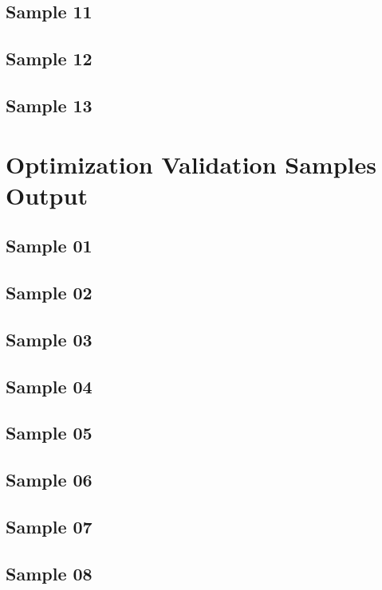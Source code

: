 \documentclass[]{article}
\begin{document}
		\subsection{Sample 11}  \pagebreak
		\subsection{Sample 12}  
		\subsection{Sample 13}  \pagebreak
	
	\section{Optimization Validation Samples Output}
		\subsection{Sample 01}  \pagebreak
		\subsection{Sample 02}  \pagebreak
		\subsection{Sample 03}  \pagebreak
		\subsection{Sample 04}  \pagebreak
		\subsection{Sample 05}  \pagebreak
		\subsection{Sample 06}  \pagebreak
		\subsection{Sample 07}  \pagebreak
		\subsection{Sample 08}  \pagebreak
\end{document}
